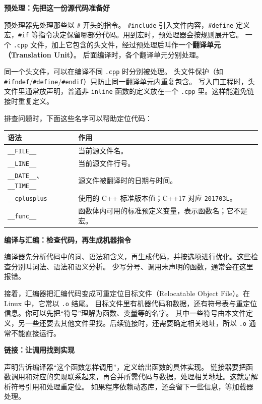 \textbf{预处理：先把这一份源代码准备好}

预处理器先处理那些以 \texttt{\#} 开头的指令。
\texttt{\#include} 引入文件内容，\texttt{\#define} 定义宏，\texttt{\#if} 等指令决定保留哪部分代码。用到宏时，预处理器会按规则展开它。
一个 \texttt{.cpp} 文件，加上它包含的头文件，经过预处理后叫作一个\textbf{翻译单元（Translation Unit）}。
后面编译时，各个翻译单元分别处理。

\begin{note}
同一个头文件，可以在编译不同 \texttt{.cpp} 时分别被处理。
头文件保护（如 \texttt{\#ifndef}/\texttt{\#define}/\texttt{\#endif}）只防止同一翻译单元内重复包含。
写入门工程时，头文件里通常放声明，普通非 \texttt{inline} 函数的定义放在一个 \texttt{.cpp} 里。这样能避免链接时重复定义。
\end{note}

排查问题时，下面这些名字可以帮助定位代码：
\begin{center}
\begin{tabular}{p{}p{}}
\toprule[1.5pt]
语法 & 作用 \\
\midrule[1pt]
\texttt{\_\_FILE\_\_} & 当前源文件名。\\
\texttt{\_\_LINE\_\_} & 当前源文件行号。\\
\texttt{\_\_DATE\_\_}、\texttt{\_\_TIME\_\_} & 源文件被翻译时的日期与时间。\\
\texttt{\_\_cplusplus} & 使用的 C++ 标准版本值；C++17 对应 \texttt{201703L}。\\
\texttt{\_\_func\_\_} & 函数体内可用的标准预定义变量，表示函数名；它不是宏。\\
\bottomrule[1.5pt]
\end{tabular}
\end{center}

\textbf{编译与汇编：检查代码，再生成机器指令}

编译器先分析代码中的词、语法和含义，再生成代码，并按选项进行优化。这些检查分别叫词法、语法和语义分析。
少写分号、调用未声明的函数，通常会在这里报错。

接着，汇编器把汇编代码变成可重定位目标文件（Relocatable Object File）。在 Linux 中，它常以 \texttt{.o} 结尾。
目标文件里有机器代码和数据，还有符号表与重定位信息。你可以先把“符号”理解为函数、变量等的名字。
其中一些符号由本文件定义，另一些还要去其他文件里找。后续链接时，还需要确定相关地址，所以 \texttt{.o} 通常不能直接运行。

\textbf{链接：让调用找到实现}

声明告诉编译器“这个函数怎样调用”，定义给出函数的具体实现。
链接器要把函数调用和对应的实现联系起来，再合并所需代码与数据，处理相关地址。这就是解析符号引用和处理重定位。
如果程序依赖动态库，还会留下一些信息，等加载器处理。

